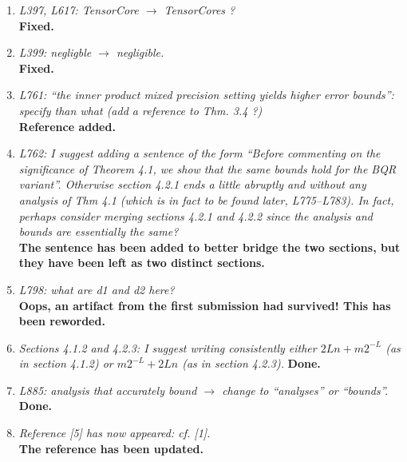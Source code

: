 \documentclass[final,onefignum,onetabnum]{siamart190516}
\begin{document}
\begin{enumerate}
    {\bf Fixed.}
    \item {\it L397, L617: TensorCore $\rightarrow$ TensorCores ?}\\
    {\bf Fixed.}
    \item {\it L399: negligble $\rightarrow$ negligible.}\\
    {\bf Fixed.}
    \item {\it L761: “the inner product mixed precision setting yields higher error bounds”: specify than what (add a reference to Thm. 3.4 ?)}\\
    {\bf Reference added.}
    \item {\it L762: I suggest adding a sentence of the form ``Before commenting on the significance of Theorem 4.1, we show that the same bounds hold for the BQR variant''. Otherwise section 4.2.1 ends a little abruptly and without any analysis of Thm 4.1 (which is in fact to be found later, L775–L783). In fact, perhaps consider merging sections 4.2.1 and 4.2.2 since the analysis and bounds are essentially the same?}\\
    {\bf The sentence has been added to better bridge the two sections, but they have been left as two distinct sections.}
    \item {\it L798: what are d1 and d2 here?}\\
    {\bf Oops, an artifact from the first submission had survived! This has been reworded.}
    \item {\it Sections 4.1.2 and 4.2.3: I suggest writing consistently either $2Ln + m2^{-L}$ (as in
section 4.1.2) or $m2^{-L} + 2Ln$ (as in section 4.2.3).}
    {\bf Done.}
    \item {\it L885: analysis that accurately bound $\rightarrow$ change to ``analyses'' or ``bounds''.}\\
    {\bf Done.}
    \item {\it Reference [5] has now appeared: cf. [1].} \\
    {\bf The reference has been updated.}
\end{enumerate}




\end{document}
